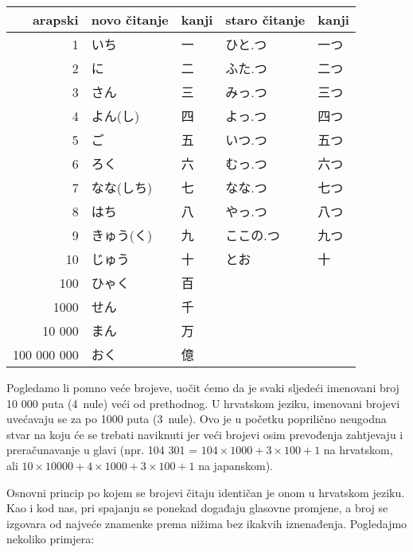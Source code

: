 	\vspace{5pt}
	\begin{table}[h]
		\centering
		\begin{tabular}{r l l l l}\toprule[2pt]
			arapski & novo čitanje & kanji & staro čitanje & kanji\\
			\midrule
			1			& いち & 一 & ひと.つ & 一つ \\
			2			& に & 二 & ふた.つ & 二つ \\
			3			& さん & 三 & みっ.つ & 三つ \\
			4			& よん(し) & 四 & よっ.つ & 四つ \\
			5			& ご & 五 & いつ.つ & 五つ \\
			6			& ろく & 六 & むっ.つ & 六つ \\
			7			& なな(しち) & 七 & なな.つ & 七つ \\
			8			& はち & 八 & やっ.つ & 八つ \\
			9			& きゅう(く) & 九 & ここの.つ & 九つ \\
			10			& じゅう & 十 & とお & 十 \\
			100			& ひゃく & 百 &  &  \\
			1000		& せん & 千 &  &  \\
			10 000		& まん & 万 &  &  \\
			100 000 000	& おく & 億 &  &  \\
			\bottomrule
		\end{tabular}
	\end{table}

	\vspace{5pt}
	Pogledamo li pomno veće brojeve, uočit ćemo da je svaki sljedeći imenovani broj 10 000 puta (4~nule) veći od prethodnog. U hrvatskom jeziku, imenovani brojevi uvećavaju se za po 1000 puta (3~nule). Ovo je u početku poprilično neugodna stvar na koju će se trebati naviknuti jer veći brojevi osim prevođenja zahtjevaju i preračunavanje u glavi (npr. 104 301 = $104\times 1000 + 3\times 100 + 1$ na hrvatskom, ali $10\times 10 000 + 4\times 1000 + 3\times 100 + 1$ na japanskom).

	\newpage
	
	Osnovni princip po kojem se brojevi čitaju identičan je onom u hrvatskom jeziku. Kao i kod nas, pri spajanju se ponekad događaju glasovne promjene, a broj se izgovara od najveće znamenke prema nižima bez ikakvih iznenađenja. Pogledajmo nekoliko primjera:
	
	\begin{reibun}
	\end{reibun}

